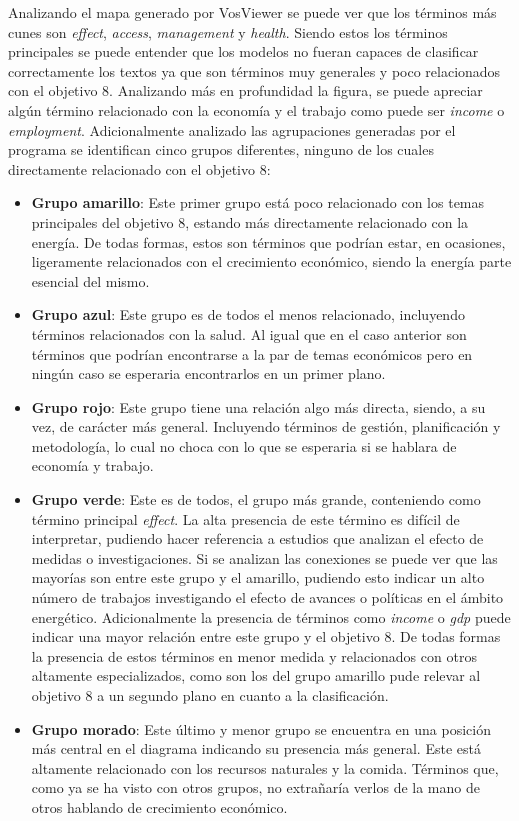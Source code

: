 Analizando el mapa generado por VosViewer se puede ver que los términos más
cunes son \textit{effect}, \textit{access}, \textit{management} y
\textit{health}. Siendo estos los términos principales se puede entender que los
modelos no fueran capaces de clasificar correctamente los textos  ya que son
términos muy generales y poco relacionados con el objetivo 8. Analizando más en
profundidad la figura, se puede apreciar algún término relacionado con la
economía y el trabajo como puede ser \textit{income} o \textit{employment}.
Adicionalmente analizado las agrupaciones generadas por el programa se
identifican cinco grupos diferentes, ninguno de los cuales directamente
relacionado con el objetivo 8:
\begin{itemize}
    \item \textbf{Grupo amarillo}: Este primer grupo está poco relacionado con
    los temas principales del objetivo 8, estando más directamente relacionado
    con la energía. De todas formas, estos son términos que podrían estar, en
    ocasiones, ligeramente relacionados con el crecimiento económico, siendo la
    energía parte esencial del mismo.
    \item \textbf{Grupo azul}: Este grupo es de todos el menos relacionado,
    incluyendo términos relacionados con la salud. Al igual que en el caso
    anterior son términos que podrían encontrarse a la par de temas económicos
    pero en ningún caso se esperaria encontrarlos en un primer plano.
    \item \textbf{Grupo rojo}: Este grupo tiene una relación algo más directa,
    siendo, a su vez, de carácter más general. Incluyendo términos de gestión,
    planificación y metodología, lo cual no choca con lo que se esperaria si se
    hablara de economía y trabajo.
    \item \textbf{Grupo verde}: Este es de todos, el grupo más grande,
    conteniendo como término principal \textit{effect}. La alta presencia de
    este término es difícil de interpretar, pudiendo hacer referencia a estudios
    que analizan el efecto de medidas o investigaciones. Si se analizan las
    conexiones se puede ver que las mayorías son entre este grupo y el amarillo,
    pudiendo esto indicar un alto número de trabajos investigando el efecto de
    avances o políticas en el ámbito energético. Adicionalmente la presencia de
    términos como \textit{income} o \textit{gdp} puede indicar una mayor
    relación entre este grupo y el objetivo 8. De todas formas la presencia de
    estos términos en menor medida y relacionados con otros altamente
    especializados, como son los del grupo amarillo pude relevar al objetivo 8 a
    un segundo plano en cuanto a la clasificación.
    \item \textbf{Grupo morado}: Este último y menor grupo se encuentra en una
    posición más central en el diagrama indicando su presencia más general. Este
    está altamente relacionado con los recursos naturales y la comida. Términos
    que, como ya se ha visto con otros grupos, no extrañaría verlos de la mano
    de otros hablando de crecimiento económico.
\end{itemize}


